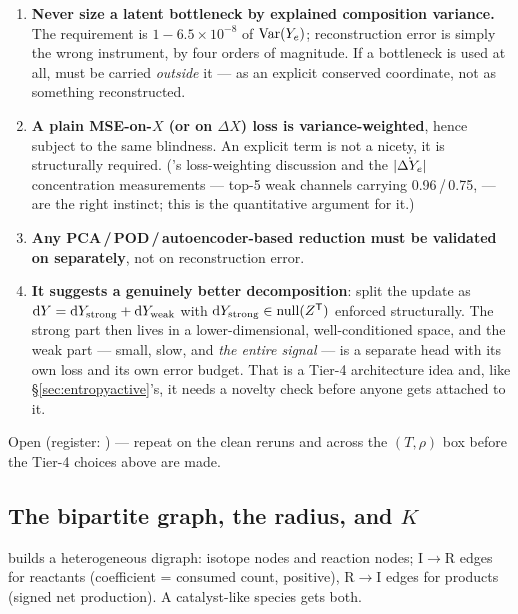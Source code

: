 \begin{enumerate}
\item \textbf{Never size a latent bottleneck by explained composition variance.}
  The requirement is $1 - 6.5\times10^{-8}$ of $\operatorname*{Var}(Y_{e})$; reconstruction error
  is simply the wrong instrument, by four orders of magnitude. If a bottleneck
  is used at all, \Ye{} must be carried \emph{outside} it --- as an explicit
  conserved coordinate, not as something reconstructed.
\item \textbf{A plain MSE-on-$X$ (or on $\Delta X$) loss is variance-weighted},
  hence subject to the same blindness. An explicit \Ye{} term is not a nicety,
  it is structurally required. ('s loss-weighting discussion and
  the $|\dot{\Delta Y_{e}}|$ concentration measurements --- top-5 weak channels carrying
  0.96\,/\,0.75,  --- are the right instinct; this is the
  quantitative argument for it.)
\item \textbf{Any PCA\,/\,POD\,/\,autoencoder-based reduction must be validated
  on \Ye{} separately}, not on reconstruction error.
\item \textbf{It suggests a genuinely better decomposition}: split the update as
  $\mathrm{d} Y = \mathrm{d} Y_{\rm strong} + \mathrm{d} Y_{\rm weak}$ with
  $\mathrm{d} Y_{\rm strong} \in \operatorname{null}(Z^{\mathsf{T}})$ enforced structurally. The
  strong part then lives in a lower-dimensional, well-conditioned space, and the
  weak part --- small, slow, and \emph{the entire \Ye{} signal} --- is a
  separate head with its own loss and its own error budget. That is a Tier-4
  architecture idea and, like \S\ref{sec:entropyactive}'s, it needs a novelty
  check before anyone gets attached to it.
\end{enumerate}

Open (register: ) --- repeat on the clean reruns and across the
$(T, \rho)$ box before the Tier-4 choices above are made.

\subsection{The bipartite graph, the radius, and \texorpdfstring{$K$}{K}}
\label{sec:graphK}

 builds a heterogeneous digraph: isotope nodes
and reaction nodes; I$\to$R edges for reactants (coefficient = consumed count,
positive), R$\to$I edges for products (signed net production). A catalyst-like
species gets both.

